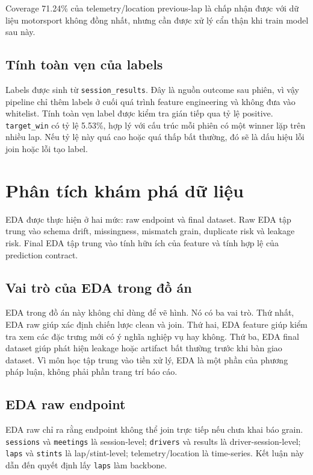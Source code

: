 \documentclass[conference]{IEEEtran}
\begin{document}
Coverage 71.24\% của telemetry/location previous-lap là chấp nhận được với dữ liệu motorsport không đồng nhất, nhưng cần được xử lý cẩn thận khi train model sau này.

\subsection{Tính toàn vẹn của labels}
Labels được sinh từ \texttt{session\_results}. Đây là nguồn outcome sau phiên, vì vậy pipeline chỉ thêm labels ở cuối quá trình feature engineering và không đưa vào whitelist. Tính toàn vẹn label được kiểm tra gián tiếp qua tỷ lệ positive. \texttt{target\_win} có tỷ lệ 5.53\%, hợp lý với cấu trúc mỗi phiên có một winner lặp trên nhiều lap. Nếu tỷ lệ này quá cao hoặc quá thấp bất thường, đó sẽ là dấu hiệu lỗi join hoặc lỗi tạo label.

\section{Phân tích khám phá dữ liệu}
EDA được thực hiện ở hai mức: raw endpoint và final dataset. Raw EDA tập trung vào schema drift, missingness, mismatch grain, duplicate risk và leakage risk. Final EDA tập trung vào tính hữu ích của feature và tính hợp lệ của prediction contract.

\subsection{Vai trò của EDA trong đồ án}
EDA trong đồ án này không chỉ dùng để vẽ hình. Nó có ba vai trò. Thứ nhất, EDA raw giúp xác định chiến lược clean và join. Thứ hai, EDA feature giúp kiểm tra xem các đặc trưng mới có ý nghĩa nghiệp vụ hay không. Thứ ba, EDA final dataset giúp phát hiện leakage hoặc artifact bất thường trước khi bàn giao dataset. Vì môn học tập trung vào tiền xử lý, EDA là một phần của phương pháp luận, không phải phần trang trí báo cáo.

\subsection{EDA raw endpoint}
EDA raw chỉ ra rằng endpoint không thể join trực tiếp nếu chưa khai báo grain. \texttt{sessions} và \texttt{meetings} là session-level; \texttt{drivers} và results là driver-session-level; \texttt{laps} và \texttt{stints} là lap/stint-level; telemetry/location là time-series. Kết luận này dẫn đến quyết định lấy \texttt{laps} làm backbone.
\end{document}
